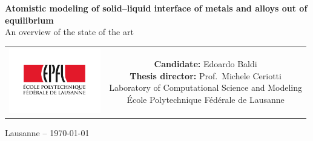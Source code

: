 \begin{titlepage}
\begin{center}


\null\vspace{2cm}
{\sffamily\huge\bfseries Atomistic modeling of solid--liquid interface of metals and alloys out of equilibrium \\[12pt]}
{\sffamily\LARGE An overview of the state of the art} \\[24pt] 
    
\vspace{4cm}
\begingroup
\sffamily
\begin{tabular}{cc}
\parbox{0.3\textwidth}{\includegraphics[angle=-90,width=4cm]{Images/epfl}}
&
\parbox{0.7\textwidth}{%
%
    {\bfseries Candidate:} Edoardo Baldi\\
    {\bfseries Thesis director:} Prof.~Michele Ceriotti\\[6pt]
%
    Laboratory of Computational Science and Modeling\\
	École Polytechnique Fédérale de Lausanne\\[6pt]
%
%
}
\end{tabular}
\vfill
{Lausanne -- \today}
\endgroup
\end{center}
\end{titlepage}
